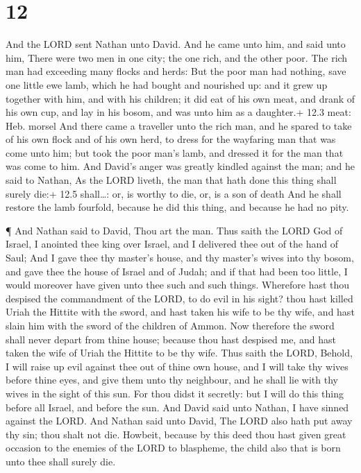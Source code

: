 \hypertarget{section-11}{%
\section{12}\label{section-11}}

 And the LORD sent Nathan unto David. And he came unto him,
and said unto him, There were two men in one city; the one rich, and the
other poor.  The rich man had exceeding many flocks and
herds:  But the poor man had nothing, save one little ewe
lamb, which he had bought and nourished up: and it grew up together with
him, and with his children; it did eat of his own meat, and drank of his
own cup, and lay in his bosom, and was unto him as a daughter.+ 12.3
meat: Heb. morsel  And there came a traveller unto the rich
man, and he spared to take of his own flock and of his own herd, to
dress for the wayfaring man that was come unto him; but took the poor
man's lamb, and dressed it for the man that was come to him.
 And David's anger was greatly kindled against the man; and
he said to Nathan, As the LORD liveth, the man that hath done this thing
shall surely die:+ 12.5 shall\ldots: or, is worthy to die, or, is a son
of death  And he shall restore the lamb fourfold, because he
did this thing, and because he had no pity.

 ¶ And Nathan said to David, Thou art the man. Thus saith
the LORD God of Israel, I anointed thee king over Israel, and I
delivered thee out of the hand of Saul;  And I gave thee thy
master's house, and thy master's wives into thy bosom, and gave thee the
house of Israel and of Judah; and if that had been too little, I would
moreover have given unto thee such and such things. 
Wherefore hast thou despised the commandment of the LORD, to do evil in
his sight? thou hast killed Uriah the Hittite with the sword, and hast
taken his wife to be thy wife, and hast slain him with the sword of the
children of Ammon.  Now therefore the sword shall never
depart from thine house; because thou hast despised me, and hast taken
the wife of Uriah the Hittite to be thy wife.  Thus saith
the LORD, Behold, I will raise up evil against thee out of thine own
house, and I will take thy wives before thine eyes, and give them unto
thy neighbour, and he shall lie with thy wives in the sight of this sun.
 For thou didst it secretly: but I will do this thing
before all Israel, and before the sun.  And David said unto
Nathan, I have sinned against the LORD. And Nathan said unto David, The
LORD also hath put away thy sin; thou shalt not die. 
Howbeit, because by this deed thou hast given great occasion to the
enemies of the LORD to blaspheme, the child also that is born unto thee
shall surely die.

